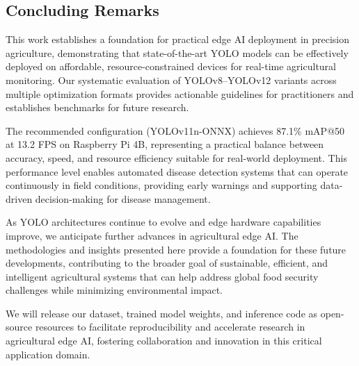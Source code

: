 \subsection{Concluding Remarks}

This work establishes a foundation for practical edge AI deployment in precision agriculture, demonstrating that state-of-the-art YOLO models can be effectively deployed on affordable, resource-constrained devices for real-time agricultural monitoring. Our systematic evaluation of YOLOv8--YOLOv12 variants across multiple optimization formats provides actionable guidelines for practitioners and establishes benchmarks for future research.

The recommended configuration (YOLOv11n-ONNX) achieves 87.1\% mAP@50 at 13.2 FPS on Raspberry Pi 4B, representing a practical balance between accuracy, speed, and resource efficiency suitable for real-world deployment. This performance level enables automated disease detection systems that can operate continuously in field conditions, providing early warnings and supporting data-driven decision-making for disease management.

As YOLO architectures continue to evolve and edge hardware capabilities improve, we anticipate further advances in agricultural edge AI. The methodologies and insights presented here provide a foundation for these future developments, contributing to the broader goal of sustainable, efficient, and intelligent agricultural systems that can help address global food security challenges while minimizing environmental impact.

We will release our dataset, trained model weights, and inference code as open-source resources to facilitate reproducibility and accelerate research in agricultural edge AI, fostering collaboration and innovation in this critical application domain.
